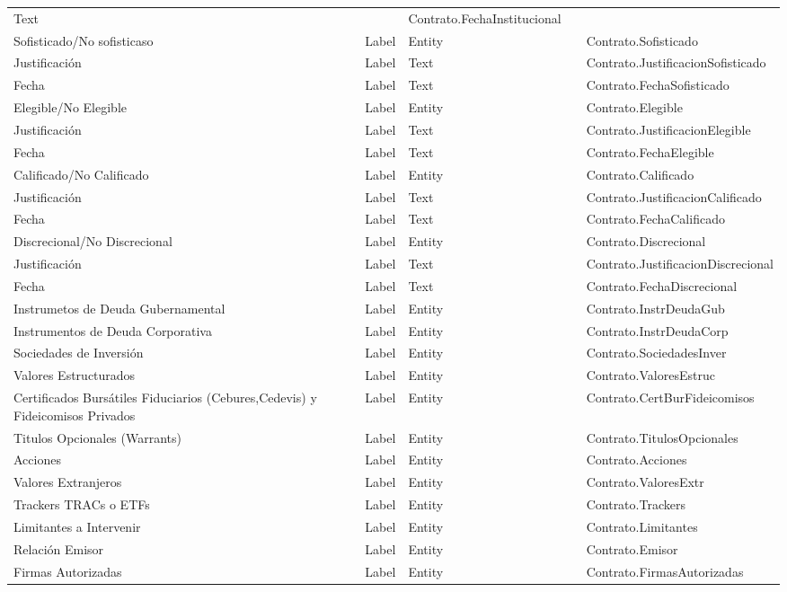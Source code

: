 \begin{table}[H]
{\begin{tabular}{ p{4cm} p{2cm} p{2cm} p{3cm} p{8cm} }
		Text &
		&
		Contrato.FechaInstitucional \\
		Sofisticado/No sofisticaso &
		Label &
		Entity &
		&
		Contrato.Sofisticado \\
		Justificaci\'on &
		Label &
		Text &
		&
		Contrato.JustificacionSofisticado \\
		Fecha &
		Label &
		Text &
		&
		Contrato.FechaSofisticado \\
		Elegible/No Elegible &
		Label &
		Entity &
		&
		Contrato.Elegible \\
		Justificaci\'on &
		Label &
		Text &
		&
		Contrato.JustificacionElegible \\
		Fecha &
		Label &
		Text &
		&
		Contrato.FechaElegible \\
		Calificado/No Calificado &
		Label &
		Entity &
		&
		Contrato.Calificado \\
		Justificaci\'on &
		Label &
		Text &
		&
		Contrato.JustificacionCalificado \\
		Fecha &
		Label &
		Text &
		&
		Contrato.FechaCalificado \\
		Discrecional/No Discrecional &
		Label &
		Entity &
		&
		Contrato.Discrecional \\
		Justificaci\'on &
		Label &
		Text &
		&
		Contrato.JustificacionDiscrecional \\
		Fecha &
		Label &
		Text &
		&
		Contrato.FechaDiscrecional \\
		Instrumetos de Deuda Gubernamental &
		Label &
		Entity &
		&
		Contrato.InstrDeudaGub \\
		Instrumentos de Deuda Corporativa &
		Label &
		Entity &
		&
		Contrato.InstrDeudaCorp \\
		Sociedades de Inversi\'on &
		Label &
		Entity &
		&
		Contrato.SociedadesInver \\
		Valores Estructurados &
		Label &
		Entity &
		&
		Contrato.ValoresEstruc \\
		Certificados Burs\'atiles Fiduciarios (Cebures,Cedevis) y Fideicomisos Privados &
		Label &
		Entity &
		&
		Contrato.CertBurFideicomisos \\
		Titulos Opcionales (Warrants) &
		Label &
		Entity &
		&
		Contrato.TitulosOpcionales \\
		Acciones &
		Label &
		Entity &
		&
		Contrato.Acciones \\
		Valores Extranjeros &
		Label &
		Entity &
		&
		Contrato.ValoresExtr \\
		Trackers TRACs o ETFs &
		Label &
		Entity &
		&
		Contrato.Trackers \\
		Limitantes a Intervenir &
		Label &
		Entity &
		&
		Contrato.Limitantes \\
		Relaci\'on Emisor &
		Label &
		Entity &
		&
		Contrato.Emisor \\
		Firmas Autorizadas &
		Label &
		Entity &
		&
		Contrato.FirmasAutorizadas \\
		\hline
	\end{tabular}
	}
\end{table}




